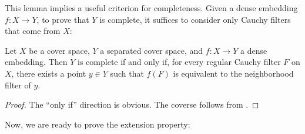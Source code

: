 \documentclass[pdflatex,sn-mathphys-num]{sn-jnl}
\theoremstyle{definition}
\theoremstyle{remark}
\numberwithin{figure}{section}
\begin{document}
This lemma implies a useful criterion for completeness.
Given a dense embedding $f : X \to Y$, to prove that $Y$ is complete, it suffices to consider only Cauchy filters that come from $X$:

\begin{lem}
Let $X$ be a cover space, $Y$ a separated cover space, and $f : X \to Y$ a dense embedding.
Then $Y$ is complete if and only if, for every regular Cauchy filter $F$ on $X$, there exists a point $y \in Y$ such that $f(F)$ is equivalent to the neighborhood filter of $y$.
\end{lem}
\begin{proof}
The ``only if'' direction is obvious.
The coverse follows from .
\end{proof}

Now, we are ready to prove the extension property:
\end{document}
